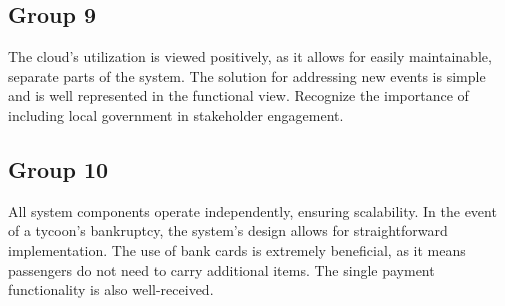 \documentclass{article}
\begin{document}
\subsection{Group 9}
The cloud's utilization is viewed positively, as it allows for easily maintainable, separate parts of the system. The solution for addressing new events is simple and is well represented in the functional view.
Recognize the importance of including local government in stakeholder engagement.

\subsection{Group 10}
All system components operate independently, ensuring scalability. In the event of a tycoon's bankruptcy, the system's design allows for straightforward implementation. The use of bank cards is extremely beneficial, as it means passengers do not need to carry additional items. The single payment functionality is also well-received.
\end{document}
